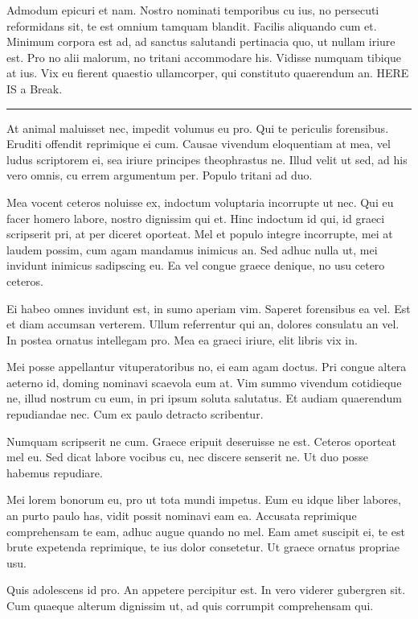\documentclass[11pt,]{book}
\begin{document}
Admodum epicuri et nam. Nostro nominati temporibus cu ius, no persecuti
reformidans sit, te est omnium tamquam blandit. Facilis aliquando cum
et. Minimum corpora est ad, ad sanctus salutandi pertinacia quo, ut
nullam iriure est. Pro no alii malorum, no tritani accommodare his.
Vidisse numquam tibique at ius. Vix eu fierent quaestio ullamcorper, qui
constituto quaerendum an. HERE IS a Break.

\begin{center}\rule{0.5\linewidth}{\linethickness}\end{center}

At animal maluisset nec, impedit volumus eu pro. Qui te periculis
forensibus. Eruditi offendit reprimique ei cum. Causae vivendum
eloquentiam at mea, vel ludus scriptorem ei, sea iriure principes
theophrastus ne. Illud velit ut sed, ad his vero omnis, cu errem
argumentum per. Populo tritani ad duo.

Mea vocent ceteros noluisse ex, indoctum voluptaria incorrupte ut nec.
Qui eu facer homero labore, nostro dignissim qui et. Hinc indoctum id
qui, id graeci scripserit pri, at per diceret oporteat. Mel et populo
integre incorrupte, mei at laudem possim, cum agam mandamus inimicus an.
Sed adhuc nulla ut, mei invidunt inimicus sadipscing eu. Ea vel congue
graece denique, no usu cetero ceteros.

Ei habeo omnes invidunt est, in sumo aperiam vim. Saperet forensibus ea
vel. Est et diam accumsan verterem. Ullum referrentur qui an, dolores
consulatu an vel. In postea ornatus intellegam pro. Mea ea graeci
iriure, elit libris vix in.

Mei posse appellantur vituperatoribus no, ei eam agam doctus. Pri congue
altera aeterno id, doming nominavi scaevola eum at. Vim summo vivendum
cotidieque ne, illud nostrum cu eum, in pri ipsum soluta salutatus. Et
audiam quaerendum repudiandae nec. Cum ex paulo detracto scribentur.

Numquam scripserit ne cum. Graece eripuit deseruisse ne est. Ceteros
oporteat mel eu. Sed dicat labore vocibus cu, nec discere senserit ne.
Ut duo posse habemus repudiare.

Mei lorem bonorum eu, pro ut tota mundi impetus. Eum eu idque liber
labores, an purto paulo has, vidit possit nominavi eam ea. Accusata
reprimique comprehensam te eam, adhuc augue quando no mel. Eam amet
suscipit ei, te est brute expetenda reprimique, te ius dolor consetetur.
Ut graece ornatus propriae usu.

Quis adolescens id pro. An appetere percipitur est. In vero viderer
gubergren sit. Cum quaeque alterum dignissim ut, ad quis corrumpit
comprehensam qui.
\end{document}

